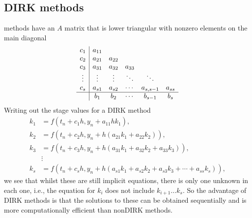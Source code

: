\documentclass[letterpaper,10pt,english]{jupyterBook}
\begin{document}
\subsection{DIRK methods}
\label{\detokenize{3_IRKs/3.1_Deriving_IRK_methods:dirk-methods}}\label{\detokenize{3_IRKs/3.1_Deriving_IRK_methods:dirk-derivation}}
\sphinxAtStartPar
{} methods have an \(A\) matrix that is lower triangular with non\sphinxhyphen{}zero elements on the main diagonal
\begin{align*}
   \begin{array}{c|ccccc}
      c_1 & a_{11} \\
      c_2 & a_{21} & a_{22} \\
      c_3 & a_{31} & a_{32} & a_{33} \\
      \vdots & \vdots & \vdots & \ddots & \ddots \\
      c_s & a_{s1} & a_{s2} & \cdots & a_{s,s-1} & a_{ss} \\ \hline
      & b_1 & b_2 & \cdots & b_{s-1} & b_s
   \end{array}
\end{align*}
\sphinxAtStartPar
Writing out the stage values for a DIRK method
\begin{align*}
   k_1 &= f(t_n + c_1h, y_n + a_{11}hk_1), \\
   k_2 &= f(t_n + c_2h, y_n + h(a_{21}k_1 + a_{22}k_2)), \\
   k_3 &= f(t_n + c_3h, y_n + h(a_{31}k_1 + a_{32}k_2 + a_{33}k_3)), \\
   & \vdots \\
   k_s &= f(t_n + c_sh, y_n + h(a_{s1}k_1 + a_{s2}k_2 + a_{s3}k_3 + \cdots + a_{ss}k_s)),
\end{align*}
\sphinxAtStartPar
we see that whilst these are still implicit equations, there is only one unknown in each one, i.e., the equation for \(k_i\) does not include \(k_{i+1} \dots k_s\). So the advantage of DIRK methods is that the solutions to these can be obtained sequentially and is more computationally efficient than non\sphinxhyphen{}DIRK methods.
\end{document}
